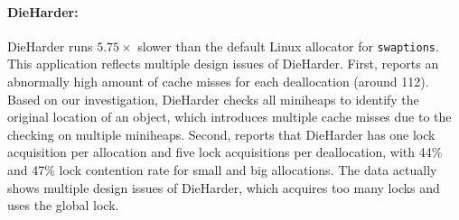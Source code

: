 \paragraph{DieHarder:} DieHarder runs $5.75\times$ slower than the default Linux allocator for \texttt{swaptions}. This application reflects multiple design issues of DieHarder. First, \MP{} reports an abnormally high amount of cache misses for each deallocation (around 112). Based on our investigation, DieHarder checks all miniheaps to identify the original location of an object, which introduces multiple cache misses due to the checking on multiple miniheaps. Second, \MP{} reports that DieHarder has one lock acquisition per allocation and five lock acquisitions per deallocation, with 44\% and 47\% lock contention rate for small and big allocations. The data actually shows multiple design issues of DieHarder, which  acquires too many locks and uses the global lock. 






 

